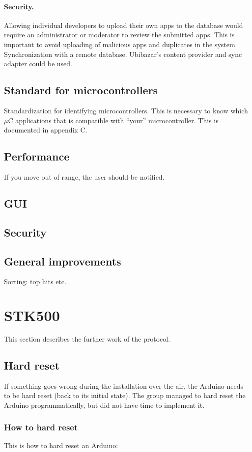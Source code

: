 	\paragraph{Security.} Allowing individual developers to upload their own apps to the database would require an administrator or moderator to review the submitted apps. This is important to avoid uploading of malicious apps and duplicates in the system.
	Synchronization with a remote database. Ubibazar's content provider and sync adapter could be used.

	\subsection{Standard for microcontrollers}
	Standardization for identifying microcontrollers. This is necessary to know which $\mu$C applications that is compatible with ``your'' microcontroller. This is documented in appendix C.

	\subsection{Performance}
	If you move out of range, the user should be notified.

	\subsection{GUI}

	\subsection{Security}

	\subsection{General improvements}
	Sorting: top hits etc.


\section{STK500}
This section describes the further work of the protocol.

	\subsection{Hard reset}
	If something goes wrong during the installation over-the-air, the Arduino needs to be hard reset (back to its initial state).
	The group managed to hard reset the Arduino programmatically, but did not have time to implement it.

		\subsubsection{How to hard reset}
		This is how to hard reset an Arduino:
		